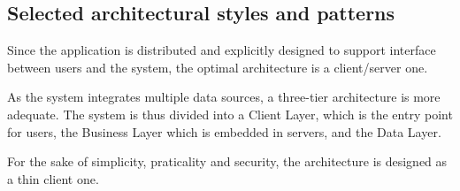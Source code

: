 \subsection{Selected architectural styles and patterns}
Since the application is distributed and explicitly designed to support interface between users and the system, the optimal architecture is a client/server one. 

As the system integrates multiple data sources, a three-tier architecture is more adequate. The system is thus divided into a Client Layer, which is the entry point for users, the Business Layer which is embedded in servers, and the Data Layer. 

For the sake of simplicity, praticality and security, the architecture is designed as a thin client one.
